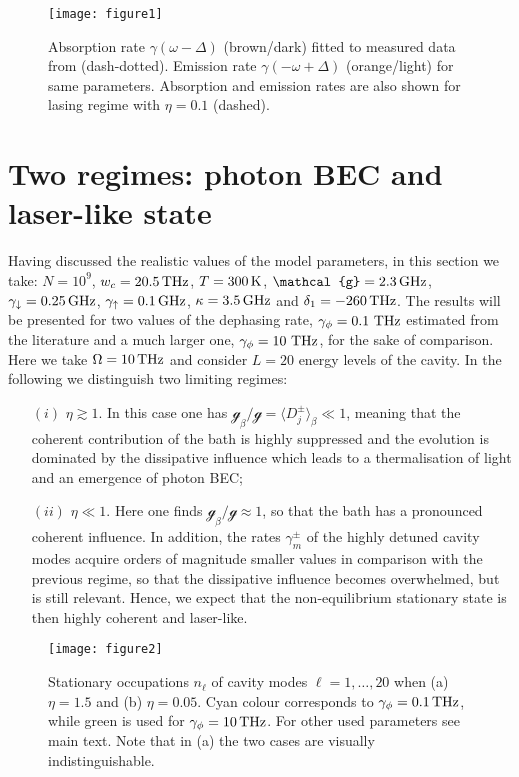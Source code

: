 \documentclass[12pt, a4paper]{iopart}
\begin{document}
\begin{figure}[!t]
\centering
\texttt{[image: figure1]}
\caption{Absorption rate $\gamma(\omega-\Delta)$ (brown/dark) fitted to measured data from \cite{PhotonBEC-Thermalization_kinetics-Weitz,Private-Julian_Schmitt} (dash-dotted). Emission rate $\gamma(-\omega+\Delta)$ (orange/light) for same parameters. Absorption and emission rates are also shown for lasing regime with $\eta = 0.1$ (dashed).}
\label{fig:rates_fit}
\end{figure}

\section{Two regimes: photon BEC and laser-like state}
\label{sec:regimes}

Having discussed the realistic values of the model parameters, in this section we take: $N=10^9$, $w_c=20.5\,{\rm THz}$, $T=300\,{\rm K}$, $\mathcal{g}=2.3\,{\rm GHz}$, $\gamma_\downarrow=0.25\,{\rm GHz}$, $\gamma_\uparrow=0.1\,{\rm GHz}$, $\kappa=3.5\,{\rm GHz}$ and $\delta_1=-260\,{\rm THz}$. {The results will be presented for two values of the dephasing rate, $\gamma_\phi=0.1~{\rm THz}$ estimated from the literature \cite{Schaefer_Dye_Lasers} and a much larger one, $\gamma_\phi=10~{\rm THz}$, for the sake of comparison.} Here we take $\Omega=10\,{\rm THz}$ and consider $L=20$ energy levels of the cavity. In the following we distinguish two limiting regimes:
%
\begin{itemize}
\item[$(i)$] $\eta\gtrsim 1$. In this case one has $\mathcal{g}_\beta/\mathcal{g}=\langle D_j^\pm \rangle_\beta\ll 1$, meaning that the coherent contribution of the bath is highly suppressed and the evolution is dominated by the dissipative influence which leads to a thermalisation of light and an emergence of photon BEC;
\item[$(ii)$] $\eta\ll 1$. Here one finds $\mathcal{g}_\beta/\mathcal{g}\approx 1$, so that the bath has a pronounced coherent influence. In addition, the rates $\gamma_m^\pm$ of the highly detuned cavity modes acquire orders of magnitude smaller values
in comparison with the previous regime, so that the dissipative influence becomes overwhelmed, but is still relevant. Hence, we expect that the non-equilibrium stationary state is then highly coherent and laser-like.
\end{itemize}
%
\begin{figure}[!t]
\centering
\texttt{[image: figure2]}
\caption{Stationary occupations $n_\ell^{}$ of cavity modes $\ell=1,\ldots,20$ when (a) $\eta=1.5$ and (b) $\eta=0.05$. {Cyan colour corresponds to $\gamma_\phi=0.1\,{\rm THz}$, while green is used for $\gamma_\phi=10\,{\rm THz}$.} For other used parameters see main text. {Note that in (a) the two cases are visually indistinguishable.}}\label{fig2}
\end{figure}
\end{document}
